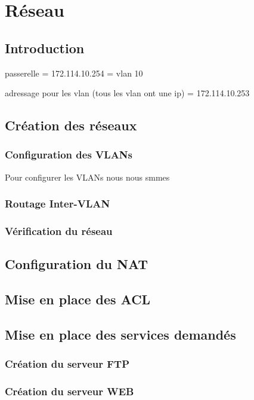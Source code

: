 \documentclass[12pt, a4paper]{article}
\begin{document}
\newpage
\section{Réseau}
	\subsection{Introduction}

	passerelle = 172.114.10.254 = vlan 10

	adressage pour les vlan (tous les vlan ont une ip) = 172.114.10.253

	\subsection{Création des réseaux}
		\subsubsection{Configuration des VLANs}
		Pour configurer les VLANs nous nous smmes 

		\subsubsection{Routage Inter-VLAN}

		\subsubsection{Vérification du réseau}

	\subsection{Configuration du NAT}

	\subsection{Mise en place des ACL}

	\subsection{Mise en place des services demandés}

		\subsubsection{Création du serveur FTP}

		\subsubsection{Création du serveur WEB}
	
\end{document}
